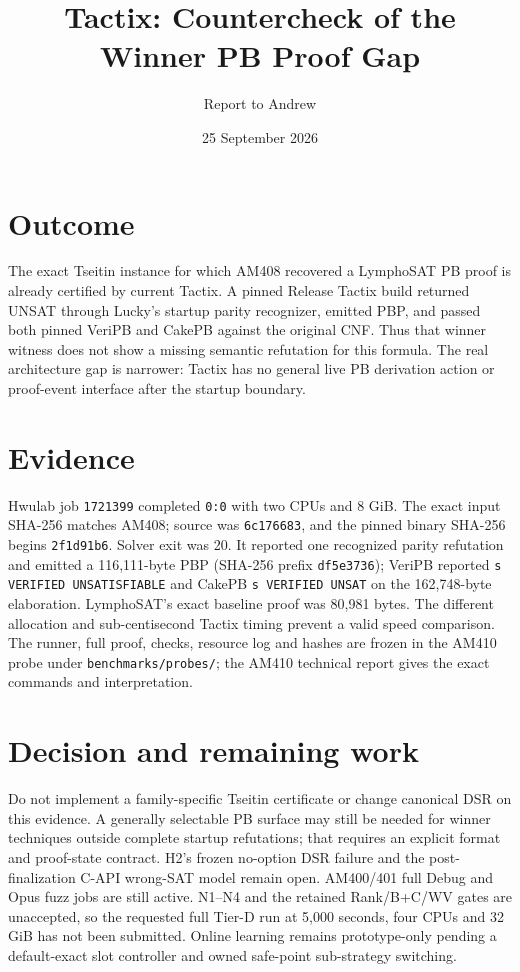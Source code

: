 \documentclass[11pt]{article}
\title{Tactix: Countercheck of the Winner PB Proof Gap}
\author{Report to Andrew}
\date{25 September 2026}
\begin{document}
\maketitle
\vspace{-1.5em}

\section*{Outcome}
The exact Tseitin instance for which AM408 recovered a LymphoSAT PB proof is
already certified by current Tactix. A pinned Release Tactix build returned
UNSAT through Lucky's startup parity recognizer, emitted PBP, and passed both
pinned VeriPB and CakePB against the original CNF. Thus that winner witness
does not show a missing semantic refutation for this formula. The real
architecture gap is narrower: Tactix has no general live PB derivation action
or proof-event interface after the startup boundary.

\section*{Evidence}
Hwulab job \texttt{1721399} completed \texttt{0:0} with two CPUs and 8 GiB.
The exact input SHA-256 matches AM408; source was \texttt{6c176683}, and the
pinned binary SHA-256 begins \texttt{2f1d91b6}. Solver exit was 20. It
reported one recognized parity refutation and emitted a 116,111-byte PBP
(SHA-256 prefix \texttt{df5e3736}); VeriPB reported
\texttt{s VERIFIED UNSATISFIABLE} and CakePB \texttt{s VERIFIED UNSAT} on the
162,748-byte elaboration. LymphoSAT's exact baseline proof was 80,981 bytes.
The different allocation and sub-centisecond Tactix timing prevent a valid
speed comparison. The runner, full proof, checks, resource log and hashes are
frozen in the AM410 probe under \texttt{benchmarks/probes/}; the AM410
technical report gives the exact commands and interpretation.

\section*{Decision and remaining work}
Do not implement a family-specific Tseitin certificate or change canonical
DSR on this evidence. A generally selectable PB surface may still be needed
for winner techniques outside complete startup refutations; that requires an
explicit format and proof-state contract. H2's frozen no-option DSR failure
and the post-finalization C-API wrong-SAT model remain open. AM400/401 full
Debug and Opus fuzz jobs are still active. N1--N4 and the retained
Rank/B+C/WV gates are unaccepted, so the requested full Tier-D run at 5,000
seconds, four CPUs and 32 GiB has not been submitted. Online learning remains
prototype-only pending a default-exact slot controller and owned safe-point
sub-strategy switching.
\end{document}
